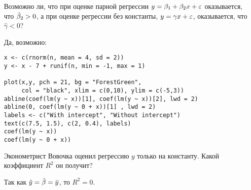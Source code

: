 \begin{problem} %
Возможно ли, что при оценке парной регрессии $y=\beta_1+\beta_2 x+\e$ оказывается, что $\hb_2>0$, а при оценке регрессии без константы, $y=\gamma x+\e$, оказывается, что $\hat{\gamma}<0$?


\begin{sol}
Да, возможно:

\begin{verbatim}
x <- c(rnorm(n, mean = 4, sd = 2))
y <- x - 7 + runif(n, min = -1, max = 1)

plot(x,y, pch = 21, bg = "ForestGreen",
     col = "black", xlim = c(0,10), ylim = c(-5,3))
abline(coef(lm(y ~ x))[1], coef(lm(y ~ x))[2], lwd = 2)
abline(0, coef(lm(y ~ 0 + x))[1] , lwd = 2)
labels <- c("With intercept", "Without intercept")
text(c(7.5, 1.5), c(2, 0.4), labels)
coef(lm(y ~ x))
coef(lm(y ~ 0 + x))
\end{verbatim}

\begin{minipage}{0.6\textwidth}
\begin{center}
\begin{tikzpicture}[scale = 0.025]

\end{tikzpicture}
\end{center}
\end{minipage}
\end{sol}
\end{problem}




\begin{problem} %
Эконометрист Вовочка оценил регрессию $y$ только на константу. Какой коэффициент $R^2$ он получит?


\begin{sol}
Так как \(\hy = \hb = \bar{y} \), то \(R^2 = 0\).
\end{sol}
\end{problem}




